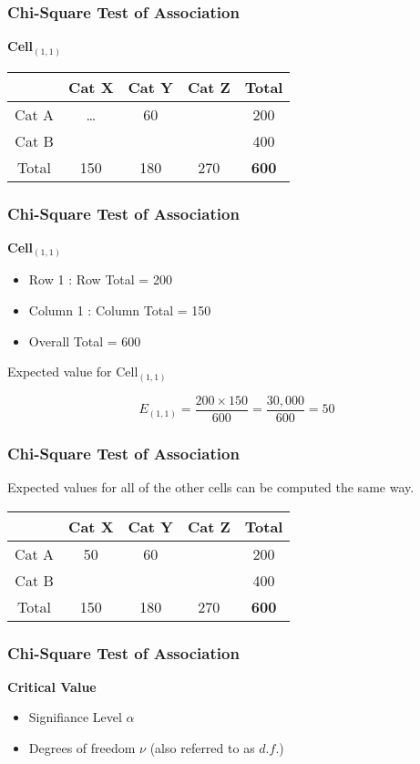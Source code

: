
\begin{frame}
	\frametitle{Chi-Square Test of Association}
	
	\Large
	\textbf{Cell$_{(1,1)}$}
	\begin{center}
		\begin{tabular}{|c|c|c|c|c|}
			\hline & Cat X & Cat Y & Cat Z & Total  \\ \hline
			Cat A & \alert{\ldots}& 60 &  & 200\\ \hline
			Cat B & \phantom{space}& \phantom{space} & \phantom{space} & 400 \\ \hline
			Total & 150 & 180 & 270 &  \textbf{600}\\ \hline
			
		\end{tabular} 
	\end{center}
	
\end{frame}

\begin{frame}
	\frametitle{Chi-Square Test of Association}
	\Large
	\textbf{Cell$_{(1,1)}$}
	\begin{itemize}
		\item Row 1 : Row Total = 200
		\item Column 1 : Column Total = 150
		\item Overall Total = 600
	\end{itemize}
	\bigskip
	
	
	Expected value for Cell$_{(1,1)}$
	
	\[ E_{(1,1)} = \frac{200 \times 150}{600} = \frac{30,000}{600} = 50 \]
\end{frame}
\begin{frame}
	\frametitle{Chi-Square Test of Association}
	
	\Large
	Expected values for all of the other cells can be computed the same way.
	\begin{center}
		\begin{tabular}{|c|c|c|c|c|}
			\hline & Cat X & Cat Y & Cat Z & Total  \\ \hline
			Cat A & 50 & 60 &  & 200\\ \hline
			Cat B & \phantom{space}& \phantom{space} & \phantom{space} & 400 \\ \hline
			Total & 150 & 180 & 270 &  \textbf{600}\\ \hline
			
		\end{tabular} 
	\end{center}
	
	
\end{frame}

\begin{frame}
\frametitle{Chi-Square Test of Association}

\Large
\textbf{Critical Value}

\begin{itemize}
\item Signifiance Level $\alpha$
\item Degrees of freedom $\nu$ (also referred to as $d.f.$)
\end{itemize}

\end{frame}

